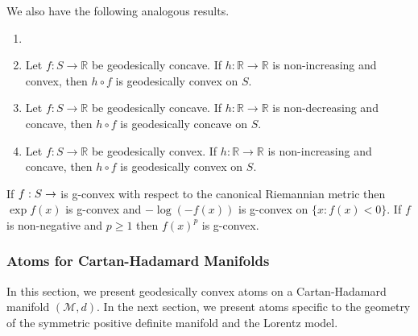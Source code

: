 \documentclass[twoside,11pt]{article}
\begin{document}
We also have the following analogous results.
\begin{corollary}
        \begin{enumerate}
            \item[]
           \item Let $f: S \rightarrow \mathbb{R}$ be geodesically concave. If $h: \mathbb{R} \rightarrow \mathbb{R}$ is non-increasing and convex, then $h \circ f$ is geodesically convex on $S$.
            \item Let $f: S \rightarrow \mathbb{R}$ be geodesically concave. If $h: \mathbb{R} \rightarrow \mathbb{R}$ is non-decreasing and concave, then $h \circ f$ is geodesically concave on $S$.
            \item Let $f: S \rightarrow \mathbb{R}$ be geodesically convex. If $h: \mathbb{R} \rightarrow \mathbb{R}$ is non-increasing and concave, then $h \circ f$ is geodesically convex on $S$.
        \end{enumerate}
    \end{corollary}

\begin{example}
    If $f:S \to \real$ is g-convex with respect to the canonical Riemannian metric then $\exp f(x)$ is g-convex and $- \log (-f(x))$ is g-convex on $\{x : f(x) < 0 \}$. If $f$ is non-negative and $p \geq 1$ then $f(x)^p$ is g-convex.
\end{example}

\subsubsection{Atoms for Cartan-Hadamard Manifolds}
In this section, we present geodesically convex atoms on a Cartan-Hadamard manifold $(\mathcal{M}, d).$ In the next section, we present atoms specific to the geometry of the symmetric positive definite manifold and the Lorentz model. 
\end{document}
